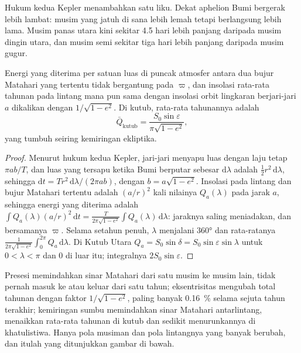 Hukum kedua Kepler menambahkan satu liku. Dekat aphelion Bumi bergerak lebih lambat: musim yang jatuh
di sana lebih lemah tetapi berlangsung lebih lama. Musim panas utara kini sekitar 4.5 hari lebih panjang daripada musim
dingin utara, dan musim semi sekitar tiga hari lebih panjang daripada musim gugur.

\begin{proposition}\label{prop:b2:orbital-forcing:annual}
Energi yang diterima per satuan luas di puncak atmosfer antara dua bujur Matahari yang tertentu
tidak bergantung pada $\varpi$, dan insolasi rata-rata tahunan pada lintang mana pun sama dengan insolasi
orbit lingkaran berjari-jari $a$ dikalikan dengan $1/\sqrt{1 - e^2}$. Di kutub, rata-rata tahunannya adalah
\[
  \bar Q_{\text{kutub}} = \frac{S_0\sin\varepsilon}{\pi\sqrt{1 - e^2}} ,
\]
yang tumbuh seiring kemiringan ekliptika.
\end{proposition}

\begin{proof}
Menurut hukum kedua Kepler, jari-jari menyapu luas dengan laju tetap $\pi ab/T$, dan luas yang tersapu
ketika Bumi berputar sebesar $\mathrm d\lambda$ adalah $\frac12 r^2\,\mathrm d\lambda$, sehingga $\mathrm dt =
T r^2\,\mathrm d\lambda/(2\pi ab)$, dengan $b = a\sqrt{1 - e^2}$. Insolasi pada lintang dan
bujur Matahari tertentu adalah $(a/r)^2$ kali nilainya $Q_a(\lambda)$ pada jarak $a$, sehingga
energi yang diterima adalah $\int Q_a(\lambda)(a/r)^2\,\mathrm dt = \frac{T}{2\pi\sqrt{1 - e^2}}\int
Q_a(\lambda)\,\mathrm d\lambda$: jaraknya saling meniadakan, dan bersamanya $\varpi$. Selama setahun
penuh, $\lambda$ menjalani \ang{360} dan rata-ratanya $\frac{1}{2\pi\sqrt{1-e^2}}\int_0^{2\pi}
Q_a\,\mathrm d\lambda$. Di Kutub Utara $Q_a = S_0\sin\delta = S_0\sin\varepsilon\sin\lambda$
untuk $0 < \lambda < \pi$ dan 0 di luar itu; integralnya $2S_0\sin\varepsilon$.
\end{proof}

Presesi memindahkan sinar Matahari dari satu musim ke musim lain, tidak pernah masuk ke atau keluar dari satu tahun; eksentrisitas
mengubah total tahunan dengan faktor $1/\sqrt{1 - e^2}$, paling banyak \qty{0.16}{\percent} selama sejuta
tahun terakhir; kemiringan sumbu memindahkan sinar Matahari antarlintang, menaikkan rata-rata tahunan di
kutub dan sedikit menurunkannya di khatulistiwa. Hanya pola musiman dan pola lintangnya yang banyak berubah,
dan itulah yang ditunjukkan gambar di bawah.

